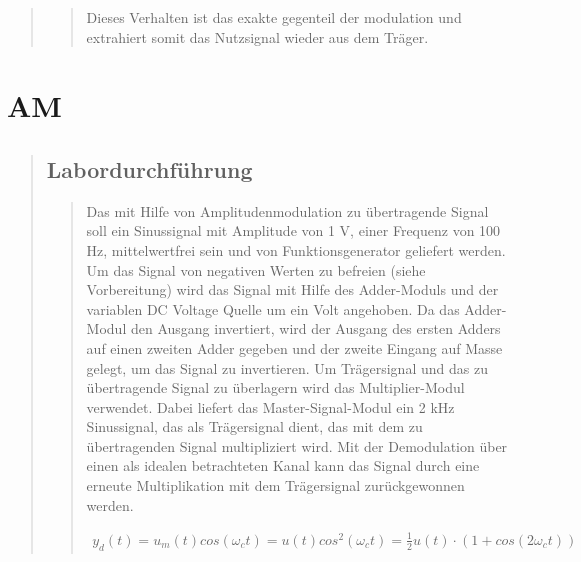 \begin{quote}
\begin{quote}
        \vspace{-1em}
        Dieses Verhalten ist das exakte gegenteil der modulation und extrahiert somit das Nutzsignal wieder aus dem Träger.
        
        
    \end{quote}
    
    
\end{quote}



\section{AM}
\begin{quote}
    
    
    \subsection{Labordurchführung}
    \begin{quote}
      Das mit Hilfe von Amplitudenmodulation zu übertragende Signal soll ein
      Sinussignal mit Amplitude von 1 V, einer Frequenz von 100 Hz, mittelwertfrei sein und von Funktionsgenerator geliefert 
      werden. Um das Signal von negativen Werten zu befreien (siehe
      Vorbereitung) wird das Signal mit Hilfe des Adder-Moduls und der variablen DC Voltage Quelle
      um ein Volt angehoben. Da das Adder-Modul den Ausgang invertiert, wird der
      Ausgang des ersten Adders auf einen zweiten Adder gegeben und der zweite
      Eingang auf Masse gelegt, um das Signal zu invertieren.
      Um Trägersignal und das zu übertragende Signal zu überlagern wird das
      Multiplier-Modul verwendet. Dabei liefert das Master-Signal-Modul ein 2
      kHz Sinussignal, das als Trägersignal dient, das mit dem zu übertragenden
      Signal multipliziert wird.
        Mit der Demodulation über einen als idealen betrachteten Kanal kann das
        Signal durch eine erneute Multiplikation mit dem Trägersignal
        zurückgewonnen werden.
        
      \begin{equation*}
        \begin{split}
         y_{d}(t)=u_{m}(t)cos(\omega_{c}t)=u(t)cos^{2}(\omega_{c}t)=\frac{1}{2}u(t)\cdot
         (1+cos(2\omega_{c}t))
         \label{eq:demodulation}
        \end{split}
        \end{equation*}
        

\end{quote}
\end{quote}
